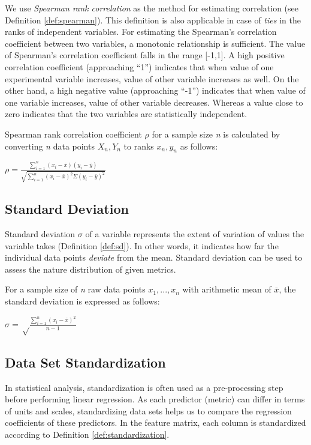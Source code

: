 We use \textit{Spearman rank correlation} as the method for estimating correlation (see Definition \ref{def:spearman}). This definition is also applicable in case of \textit{ties} in the ranks of independent variables. For estimating the Spearman's correlation coefficient between two variables, a monotonic relationship is sufficient. The value of Spearman's correlation coefficient falls in the range [-1,1]. A high positive correlation coefficient (approaching ``1'') indicates that when value of one experimental variable increases, value of other variable increases as well. On the other hand, a high negative value (approaching ``-1'') indicates that when value of one variable increases, value of other variable decreases. Whereas a value close to zero indicates that the two variables are statistically independent. 
\theoremstyle{definition}
\begin{definition}{Spearman rank correlation coefficient $\rho$ for a sample size \textit{n} is calculated by converting \textit{n} data points \textit{$X_n,Y_n$} to ranks \textit{$x_n,y_n$} as follows:}

\begin{center}\Large
$\rho = \frac{\sum\limits_{i=1}^{n}(x_i - \bar{x})(y_i - \bar{y})}{\sqrt{\sum\limits_{i=1}^{n}(x_i - \bar{x})^2\Sigma(y_i - \bar{y})^2}}$
\end{center}
\label{def:spearman}
\end{definition}

\subsection{Standard Deviation}
Standard deviation $\sigma$ of a variable represents the extent of variation of values the variable takes (Definition \ref{def:sd}). In other words, it indicates how far the individual data points \textit{deviate} from the mean. Standard deviation can be used to assess the nature distribution of given metrics. 
\theoremstyle{definition}
\begin{definition}{For a sample size of \textit{n} raw data points \textit{$x_1,...,x_n$} with arithmetic mean of $\bar{x}$, the standard deviation is expressed as follows:  }
\begin{center}\Large
$\sigma = \sqrt\frac{\sum\limits_{i=1}^{n}(x_i - \bar{x})^2} {n - 1}$
\label{def:sd}
\end{center}
\end{definition}

\subsection{Data Set Standardization}
In statistical analysis, standardization is often used as a pre-processing step before performing linear regression. As each predictor (metric) can differ in terms of units and scales, standardizing data sets helps us to compare the regression coefficients of these predictors. In the feature matrix, each column is standardized according to Definition \ref{def:standardization}.

